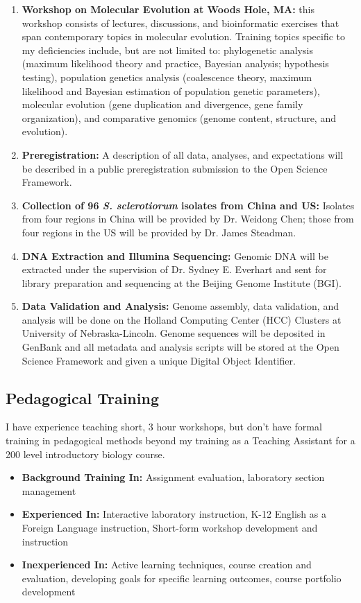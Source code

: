 \documentclass[12pt,letterpaper]{article}
\begin{document}
\begin{enumerate}
  \item \textbf{Workshop on Molecular Evolution at Woods Hole, MA:} this workshop consists of lectures, discussions, and bioinformatic exercises that span contemporary topics in molecular evolution. Training topics specific to my deficiencies include, but are not limited to: phylogenetic analysis (maximum likelihood theory and practice, Bayesian analysis; hypothesis testing), population genetics analysis (coalescence theory, maximum likelihood and Bayesian estimation of population genetic parameters), molecular evolution (gene duplication and divergence, gene family organization), and comparative genomics (genome content, structure, and evolution).
  \item \textbf{Preregistration:} A description of all data, analyses, and expectations will be described in a public preregistration submission to the Open Science Framework.
  \item \textbf{Collection of 96 \textit{S. sclerotiorum} isolates from China and US:} Isolates from four regions in China will be provided by Dr. Weidong Chen; those from four regions in the US will be provided by Dr. James Steadman. 
  \item \textbf{DNA Extraction and Illumina Sequencing:} Genomic DNA will be extracted under the supervision of Dr. Sydney E. Everhart and sent for library preparation and sequencing at the Beijing Genome Institute (BGI). 
  \item \textbf{Data Validation and Analysis:} Genome assembly, data validation,
  and analysis will be done on the Holland Computing Center (HCC) Clusters at University of Nebraska-Lincoln. Genome sequences will be deposited in GenBank and all metadata and analysis scripts will be stored at the Open Science Framework and given a unique Digital Object Identifier.
\end{enumerate}


\subsection{Pedagogical Training}

I have experience teaching short, 3 hour workshops, but don't have formal training in pedagogical methods beyond my training as a Teaching Assistant for a 200 level introductory biology course. 

\begin{itemize}
  \item \textbf{Background Training In: } Assignment evaluation, laboratory section management
  \item \textbf{Experienced In: } Interactive laboratory instruction, K-12 English as a Foreign Language instruction, Short-form workshop development and
  instruction
  \item \textbf{Inexperienced In: } Active learning techniques, course creation and evaluation, developing goals for specific learning outcomes, course portfolio development
\end{itemize}
\end{document}
